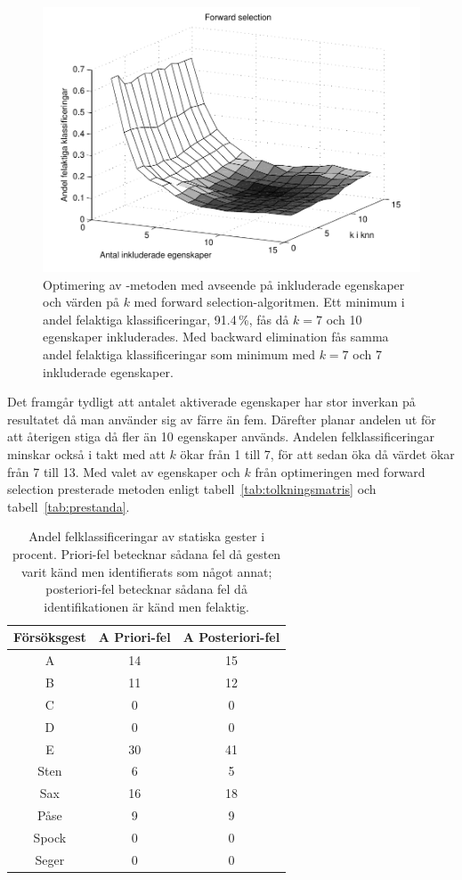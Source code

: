 \documentclass[../rapport_MVEX01-11-05]{subfiles}
\begin{document}
\begin{figure}[tbp]
    \begin{center}
        \includegraphics[width=0.5\columnwidth,clip=true]{bilder/fwd_sel}
    \end{center}
    \caption{Optimering av \knn-metoden med avseende på inkluderade egenskaper
och värden på $k$ med forward selection-algoritmen. Ett minimum i
andel felaktiga klassificeringar, 91.4\,\%, fås då
$k=7$ och 10 egenskaper inkluderades. Med backward elimination fås
samma andel felaktiga klassificeringar som minimum med $k=7$ och 7 inkluderade egenskaper.}
    \label{fig:knn-optimering}
\end{figure}

Det framgår tydligt att antalet aktiverade egenskaper har stor
inverkan på resultatet då man använder sig av färre än
fem. Därefter planar andelen ut för att återigen stiga då
fler än 10 egenskaper används. Andelen felklassificeringar
minskar också i takt med att $k$ ökar från 1 till 7, för att sedan
öka då värdet ökar från 7 till 13. Med valet av egenskaper och $k$ från
optimeringen med forward selection presterade metoden enligt
tabell~\vref{tab:tolkningsmatris} och tabell~\vref{tab:prestanda}.


\begin{table}[tbp]
	\centering
	\caption{Andel felklassificeringar av statiska gester i procent. Priori-fel
	betecknar sådana fel då gesten varit känd men identifierats
	som något annat; posteriori-fel betecknar sådana fel då
	identifikationen är känd men felaktig. }
	\smallskip
	\label{tab:prestanda}
	\begin{tabular}{c c c}
		\toprule 
		Försöksgest & A Priori-fel & A Posteriori-fel \\
		\midrule 
		A & 14&15 \\
		B & 11&12 \\
		C & 0& 0\\
		D & 0& 0\\
		E & 30& 41\\
		Sten & 6& 5\\
		Sax & 16& 18\\
		Påse & 9& 9\\
		Spock & 0& 0\\
		Seger & 0& 0\\
		\bottomrule 
	\end{tabular}
\end{table}
\end{document}
